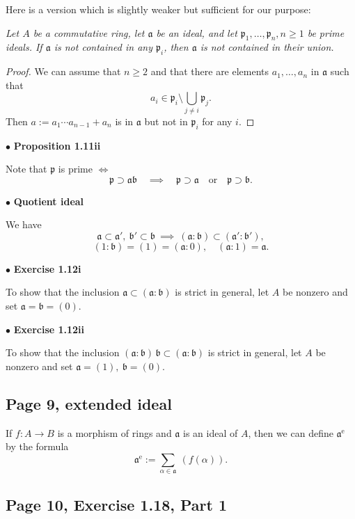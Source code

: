\documentclass[parskip=half,fontsize=12pt]{scrartcl}%
\newcommand{\oo}{\operatorname}\newcommand{\ooo}{\operatorname*}
\newcommand{\mf}{\mathfrak}
\newcommand{\ppp}{\mf p}
\newcommand{\bu}{\bullet}
\begin{document}
Here is a version which is slightly weaker but sufficient for our purpose:

\emph{Let $A$ be a commutative ring, let $\mf a$ be an ideal, and let $\ppp_1,\dots,\ppp_n,n\ge1$ be prime ideals. If $\mf a$ is not contained in any $\ppp_i$, then $\mf a$ is not contained in their union.}

\begin{proof} 
We can assume that $n\ge2$ and that there are elements $a_1,\dots,a_n$ in $\mf a$ such that 
$$
a_i\in\ppp_i\setminus\bigcup_{j \ne i}\ppp_j.
$$ 
Then $a:=a_1\cdots a_{n-1}+a_n$ is in $\mf a$ but not in $\ppp_i$ for any $i$.
\end{proof}


$\bu$ \textbf{Proposition 1.11ii}%

Note that $\ppp$ is prime $\iff$
$$
\ppp\supset\mf a\mf b\quad\implies\quad\ppp\supset\mf a\quad\text{or}\quad\ppp\supset\mf b.
$$

$\bu$ \textbf{Quotient ideal}%

We have 
$$
\mf a\subset\mf a',\ \mf b'\subset\mf b\ \implies\ (\mf a:\mf b)\subset(\mf a':\mf b'),
$$ 
$$
(1:\mf b)=(1)=(\mf a:0),\quad(\mf a:1)=\mf a.
$$

$\bu$ \textbf{Exercise 1.12i}%

To show that the inclusion $\mf a\subset(\mf a:\mf b)$ is strict in general, let $A$ be nonzero and set $\mf a=\mf b=(0)$.

$\bu$ \textbf{Exercise 1.12ii}%

To show that the inclusion $(\mf a\!:\!\mf b)\,\mf b\subset(\mf a:\mf b)$ is strict in general, let $A$ be nonzero and set $\mf a=(1),\ \mf b=(0)$.

\subsection{Page 9, extended ideal}%

If $f:A\to B$ is a morphism of rings and $\mf a$ is an ideal of $A$, then we can define $\mf a^{\oo e}$ by the formula
$$
\mf a^{\oo e}:=\sum_{\alpha\in\mf a}\ (f(\alpha)).
$$

\subsection{Page 10, Exercise 1.18, Part 1}%
\end{document}
